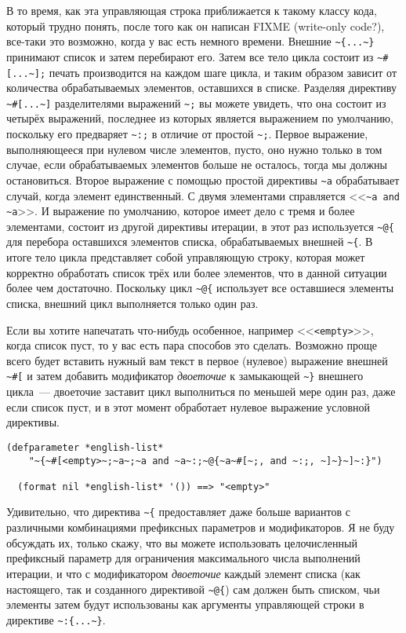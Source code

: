 В то время, как эта управляющая строка приближается к такому классу кода, который трудно понять, после того как
он написан FIXME (write-only code?), все-таки это возможно, когда у вас есть немного времени. Внешние
\lstinline!~{...~}! принимают список и затем перебирают его. Затем все тело цикла состоит из \lstinline!~#[...~];! печать
производится на каждом шаге цикла, и таким образом зависит от количества обрабатываемых элементов, оставшихся в
списке. Разделяя директиву \lstinline!~#[...~]! разделителями выражений \lstinline!~;! вы можете увидеть, что она состоит из
четырёх выражений, последнее из которых является выражением по умолчанию, поскольку его предваряет \lstinline!~:;! в
отличие от простой \lstinline!~;!. Первое выражение, выполняющееся при нулевом числе элементов, пусто, оно нужно только
в том случае, если обрабатываемых элементов больше не осталось, тогда мы должны остановиться. Второе выражение с
помощью простой директивы \lstinline!~a! обрабатывает случай, когда элемент единственный. С двумя элементами справляется
<<\lstinline!~a and ~a!>>. И выражение по умолчанию, которое имеет дело с тремя и более элементами, состоит из другой
директивы итерации, в этот раз используется \lstinline!~@{! для перебора оставшихся элементов списка, обрабатываемых внешней
\lstinline!~{!. В итоге тело цикла представляет собой управляющую строку, которая может корректно обработать список трёх
или более элементов, что в данной ситуации более чем достаточно. Поскольку цикл \lstinline!~@{! использует все
оставшиеся элементы списка, внешний цикл выполняется только один раз.

Если вы хотите напечатать что-нибудь особенное, например <<\lstinline!<empty>!>>, когда
список пуст, то у вас есть пара способов это сделать. Возможно проще всего будет вставить
нужный вам текст в первое (нулевое) выражение внешней \lstinline!~#[! и затем добавить
модификатор \textit{двоеточие} к замыкающей \lstinline!~}! внешнего цикла~--- двоеточие
заставит цикл выполниться по меньшей мере один раз, даже если список пуст, и в этот момент
 обработает нулевое выражение условной директивы.

\begin{lstlisting}[style=lisprepl]
  (defparameter *english-list*
    "~{~#[<empty>~;~a~;~a and ~a~:;~@{~a~#[~;, and ~:;, ~]~}~]~:}")

  (format nil *english-list* '()) ==> "<empty>"
\end{lstlisting}

Удивительно, что директива \lstinline!~{! предоставляет даже больше вариантов с различными комбинациями префиксных
параметров и модификаторов. Я не буду обсуждать их, только скажу, что вы можете использовать целочисленный
префиксный параметр для ограничения максимального числа выполнений итерации, и что с модификатором \textit{двоеточие}
каждый элемент списка (как настоящего, так и созданного директивой \lstinline!~@{!) сам должен быть списком, чьи
элементы затем будут использованы как аргументы управляющей строки в директиве \lstinline!~:{...~}!.

